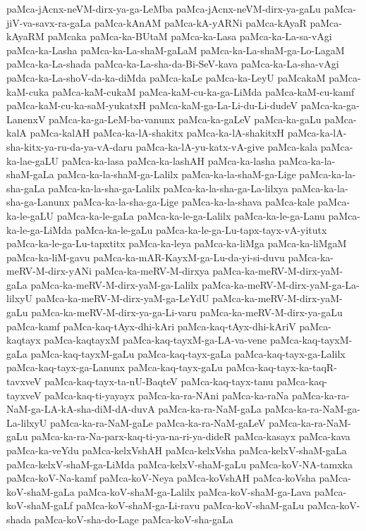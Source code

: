 {paMca-jAcnx-neVM-dirx-ya-ga-LeMba
paMca-jAcnx-neVM-dirx-ya-gaLu
paMca-jiV-va-savx-ra-gaLa
paMca-kAnAM
paMca-kA-yARNi
paMca-kAyaR
paMca-kAyaRM
paMcaka
paMca-ka-BUtaM
paMca-ka-Lasa
paMca-ka-La-sa-vAgi
paMca-ka-Lasha
paMca-ka-La-shaM-gaLaM
paMca-ka-La-shaM-ga-Lo-LagaM
paMca-ka-La-shada
paMca-ka-La-sha-da-Bi-SeV-kava
paMca-ka-La-sha-vAgi
paMca-ka-La-shoV-da-ka-diMda
paMca-kaLe
paMca-ka-LeyU
paMcakaM
paMca-kaM-cuka
paMca-kaM-cukaM
paMca-kaM-cu-ka-ga-LiMda
paMca-kaM-cu-kamf
paMca-kaM-cu-ka-saM-yukatxH
paMca-kaM-ga-La-Li-du-Li-dudeV
paMca-ka-ga-LanenxV
paMca-ka-ga-LeM-ba-vanunx
paMca-ka-gaLeV
paMca-ka-gaLu
paMca-kalA
paMca-kalAH
paMca-ka-lA-shakitx
paMca-ka-lA-shakitxH
paMca-ka-lA-sha-kitx-ya-ru-da-ya-vA-daru
paMca-ka-lA-yu-katx-vA-give
paMca-kala
paMca-ka-lae-gaLU
paMca-ka-lasa
paMca-ka-lashAH
paMca-ka-lasha
paMca-ka-la-shaM-gaLa
paMca-ka-la-shaM-ga-Lalilx
paMca-ka-la-shaM-ga-Lige
paMca-ka-la-sha-gaLa
paMca-ka-la-sha-ga-Lalilx
paMca-ka-la-sha-ga-La-lilxya
paMca-ka-la-sha-ga-Lanunx
paMca-ka-la-sha-ga-Lige
paMca-ka-la-shava
paMca-kale
paMca-ka-le-gaLU
paMca-ka-le-gaLa
paMca-ka-le-ga-Lalilx
paMca-ka-le-ga-Lanu
paMca-ka-le-ga-LiMda
paMca-ka-le-gaLu
paMca-ka-le-ga-Lu-tapx-tayx-vA-yitutx
paMca-ka-le-ga-Lu-tapxtitx
paMca-ka-leya
paMca-ka-liMga
paMca-ka-liMgaM
paMca-ka-liM-gavu
paMca-ka-mAR-KayxM-ga-Lu-da-yi-si-duvu
paMca-ka-meRV-M-dirx-yANi
paMca-ka-meRV-M-dirxya
paMca-ka-meRV-M-dirx-yaM-gaLa
paMca-ka-meRV-M-dirx-yaM-ga-Lalilx
paMca-ka-meRV-M-dirx-yaM-ga-La-lilxyU
paMca-ka-meRV-M-dirx-yaM-ga-LeYdU
paMca-ka-meRV-M-dirx-yaM-gaLu
paMca-ka-meRV-M-dirx-ya-ga-Li-varu
paMca-ka-meRV-M-dirx-ya-gaLu
paMca-kamf
paMca-kaq-tAyx-dhi-kAri
paMca-kaq-tAyx-dhi-kAriV
paMca-kaqtayx
paMca-kaqtayxM
paMca-kaq-tayxM-ga-LA-va-vene
paMca-kaq-tayxM-gaLa
paMca-kaq-tayxM-gaLu
paMca-kaq-tayx-gaLa
paMca-kaq-tayx-ga-Lalilx
paMca-kaq-tayx-ga-Lanunx
paMca-kaq-tayx-gaLu
paMca-kaq-tayx-ka-taqR-tavxveV
paMca-kaq-tayx-ta-nU-BaqteV
paMca-kaq-tayx-tanu
paMca-kaq-tayxveV
paMca-kaq-ti-yayayx
paMca-ka-ra-NAni
paMca-ka-raNa
paMca-ka-ra-NaM-ga-LA-kA-sha-diM-dA-duvA
paMca-ka-ra-NaM-gaLa
paMca-ka-ra-NaM-ga-La-lilxyU
paMca-ka-ra-NaM-gaLe
paMca-ka-ra-NaM-gaLeV
paMca-ka-ra-NaM-gaLu
paMca-ka-ra-Na-parx-kaq-ti-ya-na-ri-ya-dideR
paMca-kasayx
paMca-kava
paMca-ka-veYdu
paMca-kelxVshAH
paMca-kelxVsha
paMca-kelxV-shaM-gaLa
paMca-kelxV-shaM-ga-LiMda
paMca-kelxV-shaM-gaLu
paMca-koV-NA-tamxka
paMca-koV-Na-kamf
paMca-koV-Neya
paMca-koVshAH
paMca-koVsha
paMca-koV-shaM-gaLa
paMca-koV-shaM-ga-Lalilx
paMca-koV-shaM-ga-Lava
paMca-koV-shaM-gaLf
paMca-koV-shaM-ga-Li-ravu
paMca-koV-shaM-gaLu
paMca-koV-shada
paMca-koV-sha-do-Lage
paMca-koV-sha-gaLa
}
